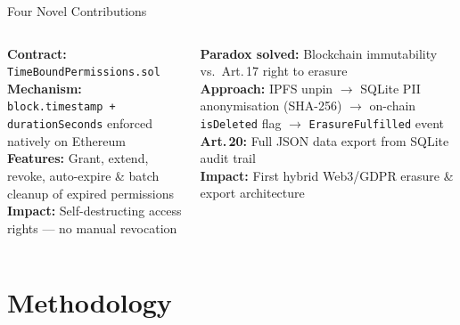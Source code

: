 \documentclass[aspectratio=169]{beamer}
\begin{document}
\begin{frame}{Four Novel Contributions}
\begin{columns}[T]
\begin{tcolorbox}[orangebox, title=\textbf{N3: Time-Bound Permissions},
  height=5.8cm, valign=top]
\scriptsize
\textbf{Contract:} \texttt{TimeBoundPermissions.sol}\\[5pt]
\textbf{Mechanism:} \texttt{block.timestamp + durationSeconds} enforced
natively on Ethereum\\[5pt]
\textbf{Features:} Grant, extend, revoke, auto-expire \& batch cleanup
of expired permissions\\[5pt]
\textbf{Impact:} Self-destructing access rights --- no manual revocation
\end{tcolorbox}
\begin{tcolorbox}[redbox, title=\textbf{N4: GDPR Compliance Module},
  height=5.8cm, valign=top]
\scriptsize
\textbf{Paradox solved:} Blockchain immutability vs.\ Art.\,17 right to erasure\\[5pt]
\textbf{Approach:} IPFS unpin $\to$ SQLite PII anonymisation (SHA-256)
$\to$ on-chain \texttt{isDeleted} flag $\to$ \texttt{ErasureFulfilled} event\\[5pt]
\textbf{Art.\,20:} Full JSON data export from SQLite audit trail\\[5pt]
\textbf{Impact:} First hybrid Web3/GDPR erasure \& export architecture
\end{tcolorbox}
\end{columns}
\end{frame}

\section{Methodology}
\end{document}
